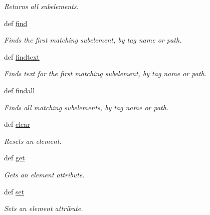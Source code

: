 \begin{DoxyCompactItemize}
\begin{DoxyCompactList}\small\item\em Returns all subelements. \end{DoxyCompactList}\item 
def \hyperlink{classPyQt-x11-gpl-4_811_82_1_1elementtree_1_1ElementTree_1_1__ElementInterface_ab2dc8b13ab524316de04faca3762251a}{find}
\begin{DoxyCompactList}\small\item\em Finds the first matching subelement, by tag name or path. \end{DoxyCompactList}\item 
def \hyperlink{classPyQt-x11-gpl-4_811_82_1_1elementtree_1_1ElementTree_1_1__ElementInterface_a3d510fd92c2a791c6e77229a3c8e3c94}{findtext}
\begin{DoxyCompactList}\small\item\em Finds text for the first matching subelement, by tag name or path. \end{DoxyCompactList}\item 
def \hyperlink{classPyQt-x11-gpl-4_811_82_1_1elementtree_1_1ElementTree_1_1__ElementInterface_a498c8cf7d5e1afb675b8ccdf69d4fe58}{findall}
\begin{DoxyCompactList}\small\item\em Finds all matching subelements, by tag name or path. \end{DoxyCompactList}\item 
def \hyperlink{classPyQt-x11-gpl-4_811_82_1_1elementtree_1_1ElementTree_1_1__ElementInterface_ab45b597346142626bdfcab82520c1b91}{clear}
\begin{DoxyCompactList}\small\item\em Resets an element. \end{DoxyCompactList}\item 
def \hyperlink{classPyQt-x11-gpl-4_811_82_1_1elementtree_1_1ElementTree_1_1__ElementInterface_ade21e72dd05d97c126f5d56fcb3504a3}{get}
\begin{DoxyCompactList}\small\item\em Gets an element attribute. \end{DoxyCompactList}\item 
def \hyperlink{classPyQt-x11-gpl-4_811_82_1_1elementtree_1_1ElementTree_1_1__ElementInterface_a09bf04557b74262d2df5f44b2549ce32}{set}
\begin{DoxyCompactList}\small\item\em Sets an element attribute. \end{DoxyCompactList}\item 

\end{DoxyCompactItemize}
